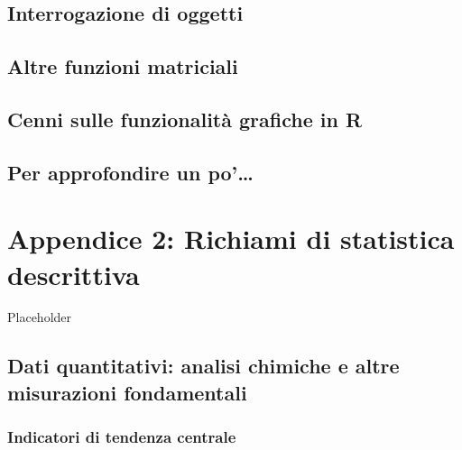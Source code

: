 \documentclass[a4paper,12pt,oneside]{book}
\begin{document}
\hypertarget{interrogazione-di-oggetti}{%
\section*{Interrogazione di oggetti}\label{interrogazione-di-oggetti}}

\hypertarget{altre-funzioni-matriciali}{%
\section*{Altre funzioni matriciali}\label{altre-funzioni-matriciali}}

\hypertarget{cenni-sulle-funzionalita-grafiche-in-r}{%
\section*{Cenni sulle funzionalità grafiche in R}\label{cenni-sulle-funzionalita-grafiche-in-r}}

\hypertarget{per-approfondire-un-po-10}{%
\section{Per approfondire un po'\ldots{}}\label{per-approfondire-un-po-10}}

\hypertarget{appendice-2-richiami-di-statistica-descrittiva}{%
\chapter{Appendice 2: Richiami di statistica descrittiva}\label{appendice-2-richiami-di-statistica-descrittiva}}

Placeholder

\hypertarget{dati-quantitativi-analisi-chimiche-e-altre-misurazioni-fondamentali}{%
\section*{Dati quantitativi: analisi chimiche e altre misurazioni fondamentali}\label{dati-quantitativi-analisi-chimiche-e-altre-misurazioni-fondamentali}}

\hypertarget{indicatori-di-tendenza-centrale}{%
\subsection*{Indicatori di tendenza centrale}\label{indicatori-di-tendenza-centrale}}
\end{document}
